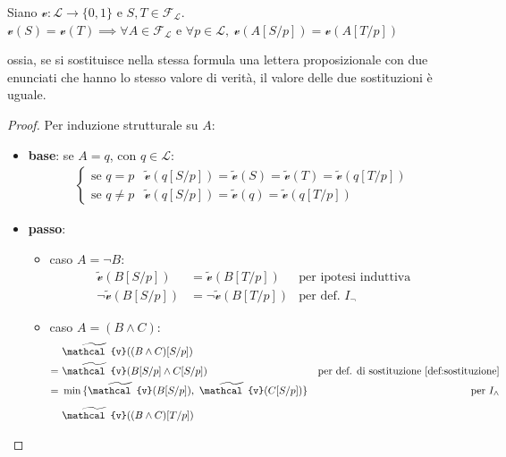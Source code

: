 \begin{lemn}[di Sostituzione]
\label{lem:sostituzione}
Siano $\mathcal{v}: \mathscr{L} \rightarrow \{0,1\}$ e $S,T \in \mathscr{F_L}$. \\
$\mathcal{v}(S) = \mathcal{v}(T) \implies \forall A \in \mathscr{F_L}$ e $\forall p \in \mathscr{L},\ \mathcal{v}(A[S/p]) = \mathcal{v}(A[T/p])$
\end{lemn}
ossia, se si sostituisce nella stessa formula una lettera proposizionale con due enunciati che hanno lo stesso valore di verità, il valore delle due sostituzioni è uguale.
\begin{proof}
  Per induzione strutturale su $A$:
  \begin{itemize}
    \item \textbf{base}: se $A = q$, con $q \in \mathscr{L}$: 
      \begin{align*}
        \begin{cases}
          \text{se } q = p & \widetilde{\mathcal{v}}(q[S/p]) = \widetilde{\mathcal{v}}(S) = \widetilde{\mathcal{v}}(T) = \widetilde{\mathcal{v}}(q[T/p]) \\
          \text{se } q \neq p & \widetilde{\mathcal{v}}(q[S/p]) = \widetilde{\mathcal{v}}(q) = \widetilde{\mathcal{v}}(q[T/p])
        \end{cases}
      \end{align*}
    \item \textbf{passo}:
      \begin{itemize}
        \item caso $A = \neg B$:
          \begin{align*}
            \widetilde{\mathcal{v}}(B[S/p]) & = \widetilde{\mathcal{v}}(B[T/p]) & \text{per ipotesi induttiva} \\
            \neg \widetilde{\mathcal{v}}(B[S/p]) & = \neg \widetilde{\mathcal{v}}(B[T/p]) & \text{per def. } I_\neg
          \end{align*}
        \item caso $A = (B \land C)$:
          \begin{align*}
              & \widetilde{\mathcal{v}}((B\land C)[S/p]) \\
            =\ & \widetilde{\mathcal{v}}(B[S/p] \land C[S/p]) & \text{per def. di sostituzione \ref{def:sostituzione}} \\
            =\ & \min{\{\widetilde{\mathcal{v}}(B[S/p]),\ \widetilde{\mathcal{v}}(C[S/p])\}} & \text{per } I_\land \\[5pt]
              & \widetilde{\mathcal{v}}((B\land C)[T/p]) \\

\end{align*}
\end{itemize}
\end{itemize}
\end{proof}

